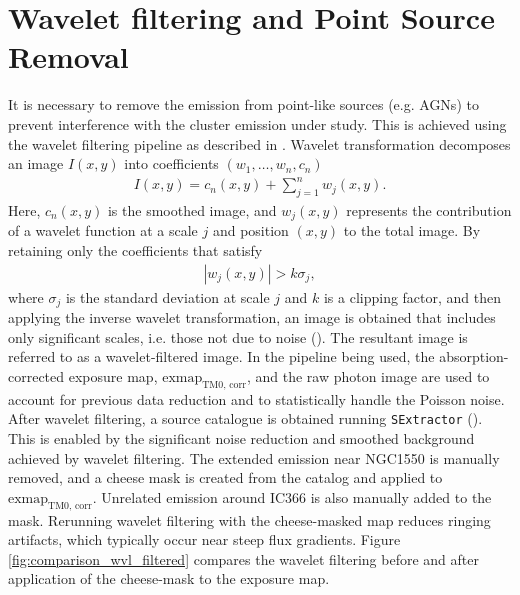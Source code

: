 \section{Wavelet filtering and Point Source Removal}
It is necessary to remove the emission from point-like sources (e.g. AGNs) to prevent interference with the cluster emission under study. This is achieved using the wavelet filtering pipeline as described in \cite{Pacaud2006}. Wavelet transformation decomposes an image \(I(x, y)\) into coefficients \((w_1, \ldots, w_n, c_n)\)
\begin{align*}
I(x, y) = c_n(x, y) + \sum_{j=1}^{n}w_j(x, y).    
\end{align*}
Here, \(c_n(x, y)\) is the smoothed image, and \(w_j(x, y)\) represents the contribution of a wavelet function at a scale \(j\) and position \((x, y)\) to the total image. By retaining only the coefficients that satisfy
\begin{align*}
|w_j(x, y)| > k\sigma_j,
\end{align*}
where \(\sigma_j\) is the standard deviation at scale \(j\) and \(k\) is a clipping factor, and then applying the inverse wavelet transformation, an image is obtained that includes only significant scales, i.e. those not due to noise (\cite{Stark1998}). The resultant image is referred to as a wavelet-filtered image. In the pipeline being used, the absorption-corrected exposure map, \(\text{exmap}_\text{TM0, corr}\), and the raw photon image are used to account for previous data reduction and to statistically handle the Poisson noise. After wavelet filtering, a source catalogue is obtained running \texttt{SExtractor} (\cite{Bertin1996}). This is enabled by the significant noise reduction and smoothed background achieved by wavelet filtering. The extended emission near NGC1550 is manually removed, and a cheese mask is created from the catalog and applied to \(\text{exmap}_\text{TM0, corr}\). Unrelated emission around IC366 is also manually added to the mask. Rerunning wavelet filtering with the cheese-masked map reduces ringing artifacts, which typically occur near steep flux gradients. Figure \ref{fig:comparison_wvl_filtered} compares the wavelet filtering before and after application of the cheese-mask to the exposure map.
%
